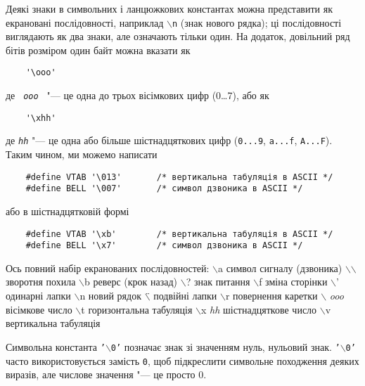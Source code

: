 \documentclass[a4paper,12pt]{book}
\begin{document}
  Деякі знаки в символьних і ланцюжкових константах можна представити як екрановані
  послідовності, наприклад \texttt{\mbox{$\backslash$}n} (знак нового рядка); ці послідовності виглядають як
  два знаки, але означають тільки один. На додаток, довільний ряд бітів розміром один байт
  можна вказати як
  \begin{verbatim}
    '\ooo'
  \end{verbatim}
  де \texttt{ \textit{ooo} } "--- це одна до трьох вісімкових цифр (0\ldots7), або як
  \begin{verbatim}
    '\xhh'
  \end{verbatim}
  де \texttt{\textit{hh}} "--- це одна або більше шістнадцяткових цифр (\texttt{0...9},
  \texttt{a...f}, \texttt{A...F}). Таким чином, ми можемо написати
  \begin{verbatim}
    #define VTAB '\013'       /* вертикальна табуляція в ASCII */
    #define BELL '\007'       /* символ дзвоника в ASCII */
  \end{verbatim}
  або в шістнадцятковій формі
  \begin{verbatim}
    #define VTAB '\xb'        /* вертикальна табуляція в ASCII */
    #define BELL '\x7'        /* символ дзвоника в ASCII */
  \end{verbatim}

  Ось повний набір екранованих послідовностей:
    {\centering                   \mbox{$\backslash$}a\* \* \*
        символ сигналу (дзвоника)\* \* \*
        \mbox{$\backslash$}\mbox{$\backslash$}
        зворотня похила
                    \mbox{$\backslash$}b
        реверс (крок назад)
        \mbox{$\backslash$}?
        знак питання
                    \mbox{$\backslash$}f
        зміна сторінки
        \mbox{$\backslash$}'
        одинарні лапки
                    \mbox{$\backslash$}n
        новий рядок
        \mbox{$\backslash$}\"{}
        подвійні лапки
                    \mbox{$\backslash$}r
        повернення каретки
        \mbox{$\backslash$}
        \textit{ooo}\* \*
        вісімкове число
                    \mbox{$\backslash$}t
        горизонтальна табуляція
        \mbox{$\backslash$}x
        \textit{hh}
        шістнадцяткове число
                    \mbox{$\backslash$}v
        вертикальна табуляція
                            }

  Символьна константа \texttt{'\mbox{$\backslash$}0'} позначає знак зі значенням нуль, нульовий знак.
  \texttt{'\mbox{$\backslash$}0'} часто використовується замість \texttt{0}, щоб підкреслити символьне
  походження деяких виразів, але числове значення "--- це просто 0.
\end{document}
